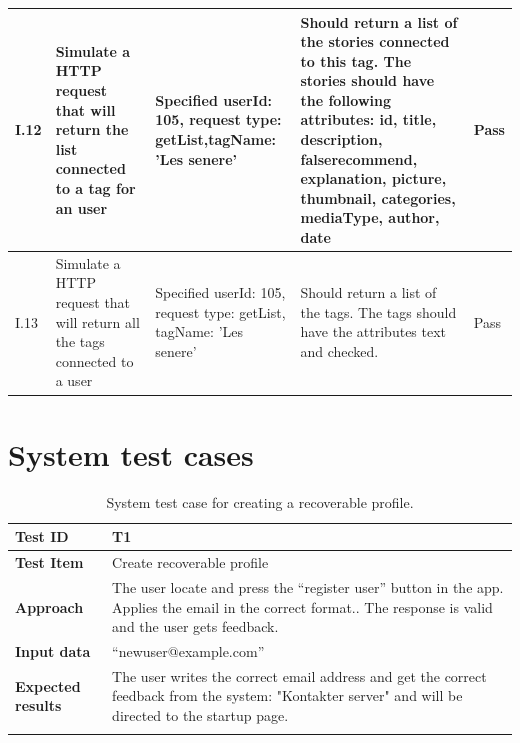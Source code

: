 \begin{appendices}
\begin{center}
\begin{longtable}{ | p{1cm} | p{5.5cm} | p{4cm} | p{4.5cm} | p{2cm}|}
		
		I.12 & Simulate a HTTP request that will return the list connected to a tag for an user  & Specified userId: 105, request type: getList,\newline tagName: 'Les senere' & Should return a list of the stories connected to this tag. The stories should have the following attributes: id, title, description, false\textunderscore recommend, explanation, picture, thumbnail, categories, mediaType, author, date & Pass\\ \hline					
		
		
		I.13 & Simulate a HTTP request that will return all the tags connected to a user  & Specified userId: 105, \newline request type: getList, \newline tagName: 'Les senere' & Should return a list of the tags. The tags should have the attributes text and checked. & Pass\\ \hline	
		
	\end{longtable}
\end{center}
\raggedbottom
\newpage		

\chapter{System test cases}
\label{app:systemtest}

\begin{table}[H]
	\centering
	\caption{System test case for creating a recoverable profile.}
	\begin{tabular}[b]{ | l | l  |}
			\hline
			\textbf{Test ID} & T1  \\ \hline
			\textbf{Test Item} & Create recoverable profile \\ \hline
			\textbf{Approach} & \begin{minipage}{5in}The user locate and press the “register user” button in the app. Applies the email in the correct format.. The response is valid and the user gets feedback. \end{minipage}\\ \hline
			\textbf{Input data} &  “newuser@example.com”\\ \hline
			
			\textbf{Expected results} & \begin{minipage}{5in}The user writes the correct email address and get the correct feedback from the system: "Kontakter server" and will be directed to the startup page.\end{minipage}\\ \hline&\\[-3.8ex]
		

\end{tabular}
\end{table}
\end{appendices}
